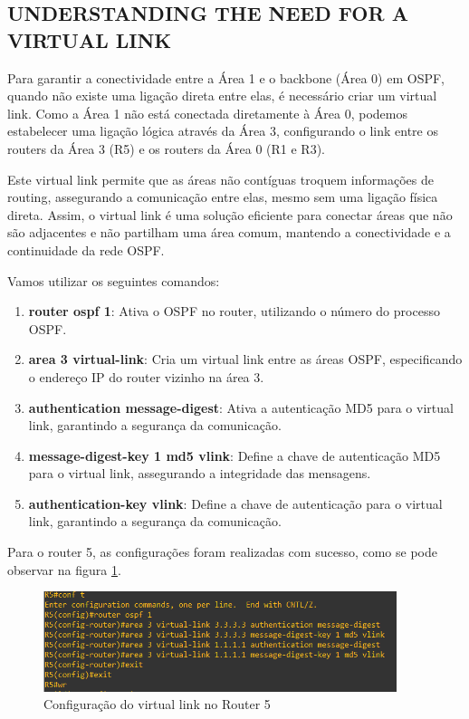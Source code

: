 \documentclass[11pt,english, openright, oneside]{book}
\begin{document}
\subsection{UNDERSTANDING THE NEED FOR A VIRTUAL LINK}
\vspace{0.2cm}

Para garantir a conectividade entre a Área 1 e o backbone (Área 0) em OSPF, quando não existe uma ligação direta entre elas, é necessário criar um virtual link. Como a Área 1 não está conectada diretamente à Área 0, podemos estabelecer uma ligação lógica através da Área 3, configurando o link entre os routers da Área 3 (R5) e os routers da Área 0 (R1 e R3).

Este virtual link permite que as áreas não contíguas troquem informações de routing, assegurando a comunicação entre elas, mesmo sem uma ligação física direta. Assim, o virtual link é uma solução eficiente para conectar áreas que não são adjacentes e não partilham uma área comum, mantendo a conectividade e a continuidade da rede OSPF.
\vspace{0.2cm}

Vamos utilizar os seguintes comandos:
\vspace{0.2cm}

\begin{enumerate}
  \item \textbf{router ospf 1}: Ativa o OSPF no router, utilizando o número do processo OSPF.
  \item \textbf{area 3 virtual-link}: Cria um virtual link entre as áreas OSPF, especificando o endereço IP do router vizinho na área 3.
  \item \textbf{authentication message-digest}: Ativa a autenticação MD5 para o virtual link, garantindo a segurança da comunicação.
  \item \textbf{message-digest-key 1 md5 vlink}: Define a chave de autenticação MD5 para o virtual link, assegurando a integridade das mensagens.
  \item \textbf{authentication-key vlink}: Define a chave de autenticação para o virtual link, garantindo a segurança da comunicação.
\end{enumerate}
\vspace{0.2cm}

\newpage
Para o router 5, as configurações foram realizadas com sucesso, como se pode observar na figura \ref{fig:config20}.
\vspace{0.2cm}

\begin{figure}[H]
    \centering
    \includegraphics[width=0.92\textwidth]{imagens/Tarefa3/13.virtual_link_R5.png}
    \caption{Configuração do virtual link no Router 5}
    \label{fig:config20}
\end{figure}
\vspace{0.2cm}
\end{document}
